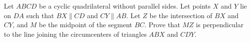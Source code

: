 Let $ABCD$ be a cyclic quadrilateral without parallel sides.
Let points $X$ and $Y$ lie on $DA$ such that $BX \parallel CD$ and $CY \parallel AB$.
Let $Z$ be the intersection of $BX$ and $CY$, and $M$ be the midpoint of the segment $BC$. 
Prove that $MZ$ is perpendicular to the line joining the circumcenters of triangles $ABX$ and $CDY$.
